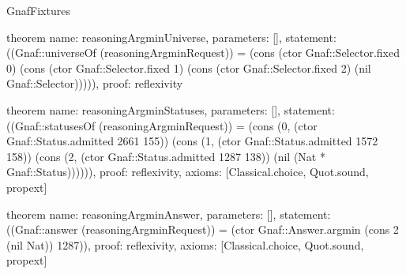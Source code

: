 \begin{lexlean}{GnafFixtures}
\begin{semanticmodule}
theorem{
  name: reasoningArgminUniverse,
  parameters: [],
  statement: ((Gnaf::universeOf (reasoningArgminRequest)) = (cons (ctor Gnaf::Selector.fixed 0) (cons (ctor Gnaf::Selector.fixed 1) (cons (ctor Gnaf::Selector.fixed 2) (nil Gnaf::Selector))))),
  proof: reflexivity{}
}

theorem{
  name: reasoningArgminStatuses,
  parameters: [],
  statement: ((Gnaf::statusesOf (reasoningArgminRequest)) = (cons (0, (ctor Gnaf::Status.admitted 2661 155)) (cons (1, (ctor Gnaf::Status.admitted 1572 158)) (cons (2, (ctor Gnaf::Status.admitted 1287 138)) (nil (Nat * Gnaf::Status)))))),
  proof: reflexivity{},
  axioms: [Classical.choice, Quot.sound, propext]
}

theorem{
  name: reasoningArgminAnswer,
  parameters: [],
  statement: ((Gnaf::answer (reasoningArgminRequest)) = (ctor Gnaf::Answer.argmin (cons 2 (nil Nat)) 1287)),
  proof: reflexivity{},
  axioms: [Classical.choice, Quot.sound, propext]
}


\end{semanticmodule}
\end{lexlean}
